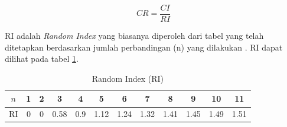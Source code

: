 \documentclass[journal,article,submit,pdftex,moreauthors]{Definitions/mdpi}
\begin{document}
\begin{equation}
CR = \frac{CI}{RI}
\label{eq:cr}
\end{equation}

RI adalah \textit{Random Index} yang biasanya diperoleh dari tabel yang telah ditetapkan berdasarkan jumlah perbandingan (n) yang dilakukan \cite{Singh2019}. RI dapat dilihat pada tabel \ref{random-index}.

\begin{table}[H]
    \caption{Random Index (RI)}
    \label{random-index}
    \centering
    \begin{tabular}{c|ccccccccccc}
        \toprule
        $n$ & 1 & 2 & 3 & 4 & 5 & 6 & 7 & 8 & 9 & 10 & 11 \\
        \midrule
        RI & 0 & 0 & 0.58 & 0.9 & 1.12 & 1.24 & 1.32 & 1.41 & 1.45 & 1.49 & 1.51 \\
        \bottomrule
    \end{tabular}
\end{table}







\end{document}
